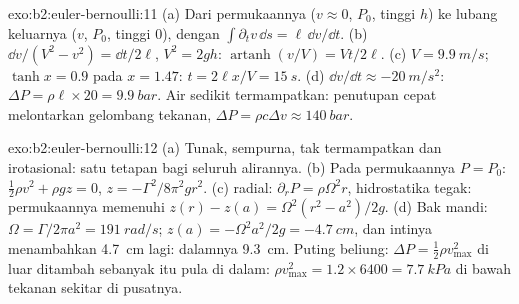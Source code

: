 \begin{solution}{exo:b2:euler-bernoulli:11}
(a) Dari permukaannya ($v \approx 0$, $P_0$, tinggi $h$) ke lubang keluarnya ($v$, $P_0$,
tinggi $0$), dengan $\int\partial_tv\,\dd s = \ell\,\dd v/\dd t$. (b) $\dd v/(V^2 -
v^2) = \dd t/2\ell$, $V^2 = 2gh$: $\operatorname{artanh}(v/V) = Vt/2\ell$. (c) $V =
\qty{9.9}{m/s}$; $\tanh x = 0.9$ pada $x = 1.47$: $t = 2\ell x/V = \qty{15}{s}$. (d)
$\dd v/\dd t \approx \qty{-20}{m/s^2}$: $\Delta P = \rho\ell \times 20 = \qty{9.9}{bar}$.
Air sedikit termampatkan: penutupan cepat melontarkan gelombang
tekanan, $\Delta P = \rho c\Delta v \approx \qty{140}{bar}$.
\end{solution}

\begin{solution}{exo:b2:euler-bernoulli:12}
(a) Tunak, sempurna, tak termampatkan dan irotasional: satu tetapan
bagi seluruh alirannya. (b) Pada permukaannya $P = P_0$: $\tfrac12\rho v^2 + \rho gz =
0$, $z = -\Gamma^2/8\pi^2gr^2$. (c)  radial: $\partial_rP = \rho\Omega^2r$,
hidrostatika tegak: permukaannya memenuhi $z(r) - z(a) = \Omega^2(r^2 -
a^2)/2g$. (d) Bak mandi: $\Omega = \Gamma/2\pi a^2 = \qty{191}{rad/s}$; $z(a) = -\Omega^2a^2/
2g = \qty{-4.7}{cm}$, dan intinya menambahkan \qty{4.7}{cm} lagi: dalamnya \qty{9.3}{cm}.
Puting beliung: $\Delta P = \tfrac12\rho v_{\max}^2$ di luar ditambah sebanyak itu pula di dalam:
$\rho v_{\max}^2 = 1.2 \times 6400 = \qty{7.7}{kPa}$ di bawah tekanan sekitar di pusatnya.
\end{solution}

